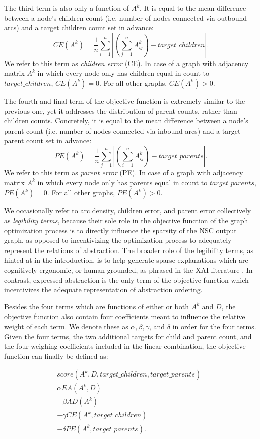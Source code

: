 The third term is also only a function of $A^k$. It is equal to the mean difference between a node's children count (i.e. number of nodes connected via outbound arcs) and a target children count set in advance: $$CE(A^k) = \frac{1}{n} \sum_{i=1}^{n} \left|(\sum_{j=1}^{n}A^k_{ij}) - target\_children\right|.$$ We refer to this term as \textit{children error} (CE). In case of a graph with adjacency matrix $A^k$ in which every node only has children equal in count to $target\_children$, $CE(A^k)=0$. For all other graphs, $CE(A^k) > 0$.

The fourth and final term of the objective function is extremely similar to the previous one, yet it addresses the distribution of parent counts, rather than children counts. Concretely, it is equal to the mean difference between a node's parent count (i.e. number of nodes connected via inbound arcs) and a target parent count set in advance: $$PE(A^k) = \frac{1}{n} \sum_{j=1}^{n} \left|(\sum_{i=1}^{n}A^k_{ij}) - target\_parents\right|.$$ We refer to this term as \textit{parent error} (PE). In case of a graph with adjacency matrix $A^k$ in which every node only has parents equal in count to $target\_parents$, $PE(A^k)=0$. For all other graphs, $PE(A^k) > 0$.

We occasionally refer to arc density, children error, and parent error collectively as \textit{legibility terms}, because their sole role in the objective function of the graph optimization process is to directly influence the sparsity of the NSC output graph, as opposed to incentivizing the optimization process to adequately represent the relations of abstraction. The broader role of the legibility terms, as hinted at in the introduction, is to help generate sparse explanations which are cognitively ergonomic, or human-grounded, as phrased in the XAI literature \citep{madsen_post-hoc_2021}. In contrast, expressed abstraction is the only term of the objective function which incentivizes the adequate representation of abstraction ordering.

Besides the four terms which are functions of either or both $A^k$ and $D$, the objective function also contain four coefficients meant to influence the relative weight of each term. We denote these as $\alpha, \beta, \gamma$, and $\delta$ in order for the four terms. Given the four terms, the two additional targets for child and parent count, and the four weighing coefficients included in the linear combination, the objective function can finally be defined as:

\begin{align*}
     & score(A^k, D, target\_children, target\_parents) = \\
     & \alpha EA(A^k, D)                                  \\
     & - \beta AD(A^k)                                    \\
     & - \gamma CE(A^k, target\_children)                 \\
     & - \delta PE(A^k, target\_parents).
\end{align*}

